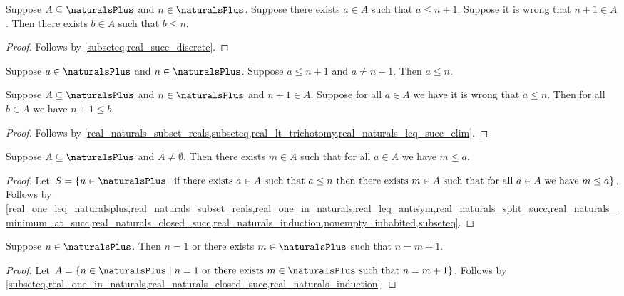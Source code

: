 \begin{lemma}\label{real_naturals_split_succ}
    Suppose $A\subseteq\naturalsPlus$ and $n\in\naturalsPlus$.
    Suppose there exists $a\in A$ such that $a \leq n + 1$.
    Suppose it is wrong that $n + 1\in A$.
    Then there exists $b\in A$ such that $b \leq n$.
\end{lemma}
\begin{proof}
    Follows by \cref{subseteq,real_succ_discrete}.
\end{proof}

\begin{lemma}\label{real_naturals_leq_succ_elim}
    Suppose $a\in\naturalsPlus$ and $n\in\naturalsPlus$.
    Suppose $a \leq n + 1$ and $a \neq n + 1$.
    Then $a \leq n$.
\end{lemma}

\begin{lemma}\label{real_naturals_minimum_at_succ}
    Suppose $A\subseteq\naturalsPlus$ and $n\in\naturalsPlus$ and $n + 1\in A$.
    Suppose for all $a\in A$ we have it is wrong that $a \leq n$.
    Then for all $b\in A$ we have $n + 1 \leq b$.
\end{lemma}
\begin{proof}
    Follows by \cref{real_naturals_subset_reals,subseteq,real_lt_trichotomy,real_naturals_leq_succ_elim}.
\end{proof}

\begin{proposition}\label{real_naturals_least_element}
    Suppose $A\subseteq\naturalsPlus$ and $A\neq \emptyset$.
    Then there exists $m\in A$ such that for all $a\in A$ we have $m \leq a$.
\end{proposition}
\begin{proof}
    Let $S = \{ n\in\naturalsPlus \mid \text{if there exists $a\in A$ such that $a \leq n$ then there exists $m\in A$ such that for all $a\in A$ we have $m \leq a$}\}$. Follows by \cref{real_one_leq_naturalsplus,real_naturals_subset_reals,real_one_in_naturals,real_leq_antisym,real_naturals_split_succ,real_naturals_minimum_at_succ,real_naturals_closed_succ,real_naturals_induction,nonempty_inhabited,subseteq}.
\end{proof}


\begin{lemma}\label{real_naturals_predecessor}
    Suppose $n\in\naturalsPlus$.
    Then $n = 1$ or there exists $m\in\naturalsPlus$ such that $n = m + 1$.
\end{lemma}
\begin{proof}
    Let $A = \{ n\in\naturalsPlus \mid \text{$n = 1$ or there exists $m\in\naturalsPlus$ such that $n = m + 1$}\}$. Follows by \cref{subseteq,real_one_in_naturals,real_naturals_closed_succ,real_naturals_induction}.
\end{proof}


